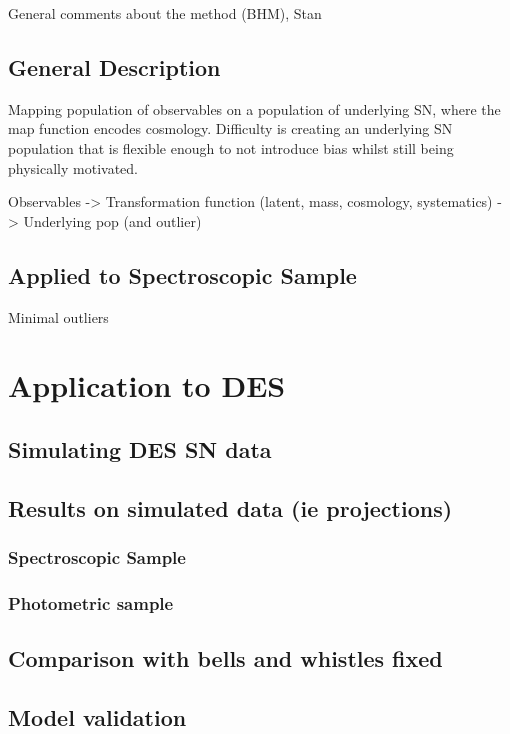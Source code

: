 \documentclass[a4paper,fleqn,usenatbib]{mnras}
\begin{document}
General comments about the method (BHM), Stan

\subsection{General Description}

Mapping population of observables on a population of underlying SN, where the map function encodes
cosmology. Difficulty is creating an underlying SN population that is flexible enough to not introduce bias whilst still being physically motivated. 


Observables -> Transformation function (latent, mass, cosmology, systematics) -> Underlying pop (and outlier)

\subsection{Applied to Spectroscopic Sample}

Minimal outliers

\section{Application to DES}

\subsection{Simulating DES SN data}

\subsection{Results on simulated data (ie projections)}

\subsubsection{Spectroscopic Sample}

\subsubsection{Photometric sample}

\subsection{Comparison with bells and whistles fixed}

\subsection{Model validation}
\end{document}
